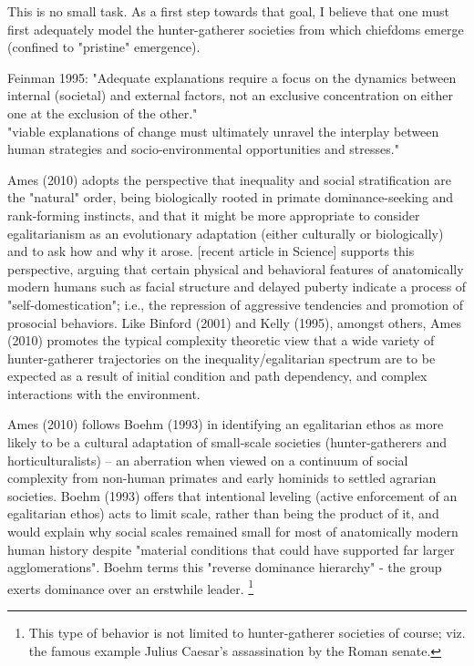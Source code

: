 \documentclass[11pt,oneside,a4paper,onecolumn]{article}
\begin{document}
This is no small task.  As a first step towards that goal, I believe that one must first adequately model the hunter-gatherer societies from which chiefdoms emerge (confined to "pristine" emergence).

Feinman 1995: "Adequate explanations require a focus on the dynamics between internal (societal) and external factors, not an exclusive concentration on either one at the exclusion of the other."\\

"viable explanations of change must ultimately unravel the interplay between human strategies and socio-environmental opportunities and stresses."

Ames (2010) adopts the perspective that inequality and social stratification are the "natural" order, being biologically rooted in primate dominance-seeking and rank-forming instincts, and that it might be more appropriate to consider egalitarianism as an evolutionary adaptation (either culturally or biologically) and to ask how and why it arose.  [recent article in Science] supports this perspective, arguing that certain physical and behavioral features of anatomically modern humans such as facial structure and delayed puberty indicate a process of "self-domestication"; i.e., the repression of aggressive tendencies and promotion of prosocial behaviors.  Like Binford (2001) and Kelly (1995), amongst others, Ames (2010) promotes the typical complexity theoretic view that a wide variety of hunter-gatherer trajectories on the inequality/egalitarian spectrum are to be expected as a result of initial condition and path dependency, and complex interactions with the environment.

Ames (2010) follows Boehm (1993) in identifying an egalitarian ethos as more likely to be a cultural adaptation of small-scale societies (hunter-gatherers and horticulturalists) -- an aberration when viewed on a continuum of social complexity from non-human primates and early hominids to settled agrarian societies.  Boehm (1993) offers that intentional leveling (active enforcement of an egalitarian ethos) acts to limit scale, rather than being the product of it, and would explain why social scales remained small for most of anatomically modern human history despite "material conditions that could have supported far larger agglomerations".  Boehm terms this "reverse dominance hierarchy" - the group exerts dominance over an erstwhile leader. \footnote{This type of behavior is not limited to hunter-gatherer societies of course; viz. the famous example Julius Caesar's assassination by the Roman senate.}
\end{document}
